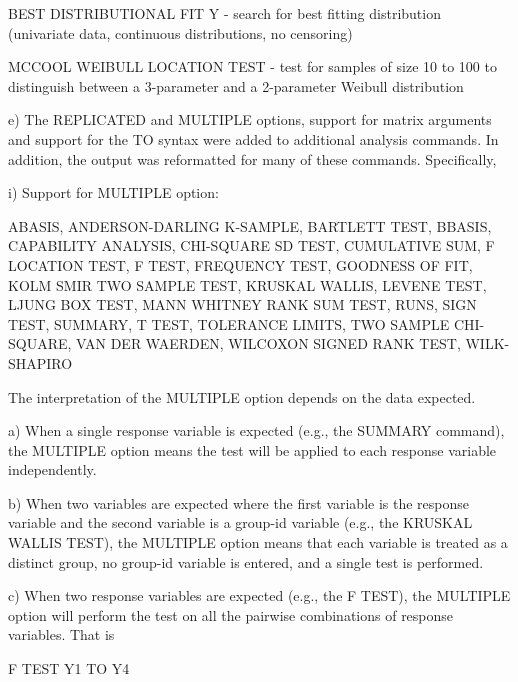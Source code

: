 {           BEST DISTRIBUTIONAL FIT Y   - search for best fitting distribution
                                        (univariate data, continuous
                                        distributions, no censoring)

           MCCOOL WEIBULL LOCATION TEST - test for samples of size 10 to 100
                                          to distinguish between a
                                          3-parameter and a 2-parameter
                                          Weibull distribution

    e) The REPLICATED and MULTIPLE options, support for matrix arguments
       and support for the TO syntax were added to additional analysis
       commands.  In addition, the output was reformatted for many of these
       commands.  Specifically,

          i) Support for MULTIPLE option:

             ABASIS, ANDERSON-DARLING K-SAMPLE, BARTLETT TEST, BBASIS,
             CAPABILITY ANALYSIS, CHI-SQUARE SD TEST, CUMULATIVE SUM,
             F LOCATION TEST, F TEST, FREQUENCY TEST, GOODNESS OF FIT,
             KOLM SMIR TWO SAMPLE TEST, KRUSKAL WALLIS, LEVENE TEST,
             LJUNG BOX TEST, MANN WHITNEY RANK SUM TEST, RUNS, SIGN TEST,
             SUMMARY, T TEST, TOLERANCE LIMITS, TWO SAMPLE CHI-SQUARE,
             VAN DER WAERDEN, WILCOXON SIGNED RANK TEST, WILK-SHAPIRO

             The interpretation of the MULTIPLE option depends on the
             data expected.

             a) When a single response variable is expected (e.g., the
                SUMMARY command), the MULTIPLE option means the test will
                be applied to each response variable independently.

             b) When two variables are expected where the first variable
                is the response variable and the second variable is a
                group-id variable (e.g., the KRUSKAL WALLIS TEST), the
                MULTIPLE option means that each variable is treated as
                a distinct group, no group-id variable is entered, and a
                single test is performed.

             c) When two response variables are expected (e.g., the
                F TEST), the MULTIPLE option will perform the test on all
                the pairwise combinations of response variables.  That is

                    F TEST Y1 TO Y4

}
